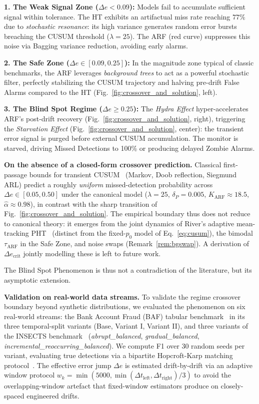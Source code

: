 \documentclass[10pt,conference]{IEEEtran}
\theoremstyle{definition}
\begin{document}
\textbf{1. The Weak Signal Zone ($\Delta e < 0.09$):} Models fail to accumulate sufficient signal within tolerance. The HT exhibits an artifactual miss rate reaching $77\%$ due to \emph{stochastic resonance}: its high variance generates random error bursts breaching the CUSUM threshold ($\lambda=25$). The ARF (red curve) suppresses this noise via Bagging variance reduction, avoiding early alarms.

\textbf{2. The Safe Zone ($\Delta e \in[0.09, 0.25]$):} In the magnitude zone typical of classic benchmarks, the ARF leverages \emph{background trees} to act as a powerful stochastic filter, perfectly stabilizing the CUSUM trajectory and halving pre-drift False Alarms compared to the HT (Fig.~\ref{fig:crossover_and_solution}, left).

\textbf{3. The Blind Spot Regime ($\Delta e \ge 0.25$):} The \emph{Hydra Effect} hyper-accelerates ARF's post-drift recovery (Fig.~\ref{fig:crossover_and_solution}, right), triggering the \emph{Starvation Effect} (Fig.~\ref{fig:crossover_and_solution}, center): the transient error signal is purged before external CUSUM accumulation. The monitor is starved, driving Missed Detections to 100\% or producing delayed Zombie Alarms.

\noindent\textbf{On the absence of a closed-form crossover prediction.}
Classical first-passage bounds for transient CUSUM~\cite{tartakovsky_2023_transient,tartakovsky_2014} (Markov, Doob reflection, Siegmund ARL) predict a roughly \emph{uniform} missed-detection probability across $\Delta e \in [0.05, 0.50]$ under the canonical model ($\lambda{=}25$, $\delta_P{=}0.005$, $K_{\mathrm{ARF}}{\approx}18.5$, $\hat\alpha{\approx}0.98$), in contrast with the sharp transition of Fig.~\ref{fig:crossover_and_solution}. The empirical boundary thus does not reduce to canonical theory: it emerges from the joint dynamics of River's adaptive mean-tracking PHT~\cite{montiel_river_2021} (distinct from the fixed-$p_0$ model of Eq.~\eqref{eq:cusum}), the bimodal $\tau_{\mathrm{ARF}}$ in the Safe Zone, and noise swaps (Remark~\ref{rem:bgswap}). A derivation of $\Delta e_{\mathrm{crit}}$ jointly modelling these is left to future work.

The Blind Spot Phenomenon is thus not a contradiction of the literature, but its asymptotic extension.

\textbf{Validation on real-world data streams.}
To validate the regime crossover boundary beyond synthetic distributions, we evaluated the phenomenon on six real-world streams: the Bank Account Fraud (BAF) tabular benchmark~\cite{jesus_baf_2022} in its three temporal-split variants (Base, Variant I, Variant II), and three variants of the INSECTS benchmark~\cite{souza_insects_2020} (\emph{abrupt\_balanced}, \emph{gradual\_balanced}, \emph{incremental\_reoccurring\_balanced}). We compute F1 over 30 random seeds per variant, evaluating true detections via a bipartite Hopcroft-Karp matching protocol~\cite{hopcroft_karp_1973}. The effective error jump $\Delta e$ is estimated drift-by-drift via an adaptive window protocol $w_k = \min(5000, \min(\Delta t_{\mathrm{left}}, \Delta t_{\mathrm{right}})/3)$ to avoid the overlapping-window artefact that fixed-window estimators produce on closely-spaced engineered drifts.
\end{document}

